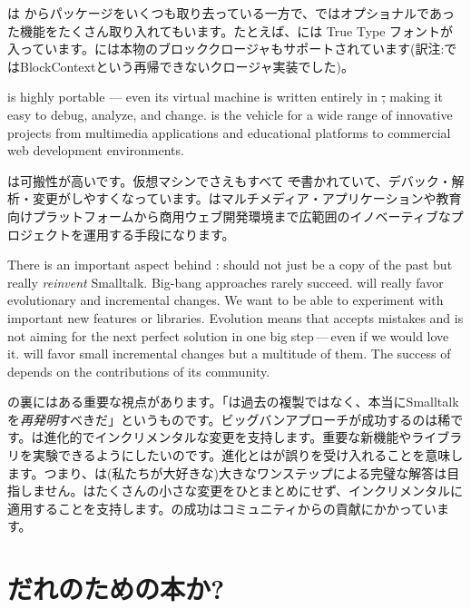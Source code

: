 \documentclass[a4paper,10pt,twoside]{book}
\begin{document}
\pharo は \squeak からパッケージをいくつも取り去っている一方で、\squeak ではオプショナルであった機能をたくさん取り入れてもいます。たとえば、\pharo には True Type フォントが入っています。\pharo には本物のブロッククロージャもサポートされています(訳注:\squeak ではBlockContextという再帰できないクロージャ実装でした)。

\pharo is highly portable --- even its virtual machine is written entirely in \st, making it easy to debug, analyze, and change. \pharo is the vehicle for a wide range of innovative projects from multimedia applications and educational platforms to commercial web development environments. 

\pharo は可搬性が高いです。仮想マシンでさえもすべて \st で書かれていて、デバック・解析・変更がしやすくなっています。\pharo はマルチメディア・アプリケーションや教育向けプラットフォームから商用ウェブ開発環境まで広範囲のイノベーティブなプロジェクトを運用する手段になります。

There is an important aspect behind \pharo: \pharo should not just be a copy of the past but really \emph{reinvent} Smalltalk. Big-bang approaches rarely succeed. \pharo will really favor evolutionary and incremental changes. We want to be able to experiment with important new features or libraries. Evolution means that \pharo accepts mistakes and is not aiming for the next perfect solution in one big step\,---\,even if we would love it. \pharo will favor small incremental changes but a multitude of them. The success of \pharo depends on the contributions of its community.

\pharo の裏にはある重要な視点があります。「\pharo は過去の複製ではなく、本当にSmalltalkを\emph{再発明}すべきだ」というものです。ビッグバンアプローチが成功するのは稀です。\pharo は進化的でインクリメンタルな変更を支持します。重要な新機能やライブラリを実験できるようにしたいのです。進化とは\pharo が誤りを受け入れることを意味します。つまり、\pharo は(私たちが大好きな)大きなワンステップによる完璧な解答は目指しません。\pharo はたくさんの小さな変更をひとまとめにせず、インクリメンタルに適用することを支持します。\pharo の成功はコミュニティからの貢献にかかっています。

\section*{だれのための本か?}
\end{document}
